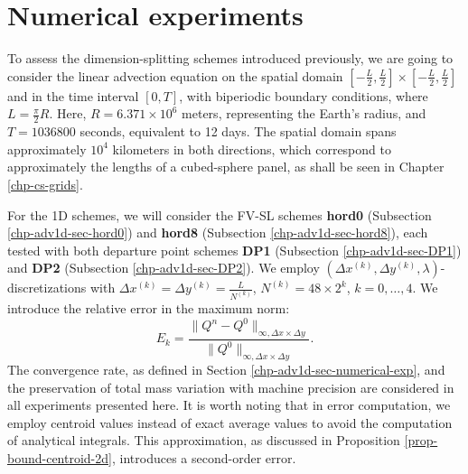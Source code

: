\section{Numerical experiments}
\label{sec-ds-exp}
To assess the dimension-splitting schemes introduced previously, we are going to consider the linear advection 
equation on the spatial domain $[-\frac{L}{2},\frac{L}{2}]\times[-\frac{L}{2},\frac{L}{2}]$ and in the time interval $[0,T]$, 
with biperiodic boundary conditions, where $L = \frac{\pi}{2} R$. Here, $R = 6.371 \times 10^6$ meters, 
representing the Earth's radius, and $T = 1036800$ seconds, equivalent to 12 days. 
The spatial domain spans approximately $10^4$ kilometers in both directions,
which correspond to approximately the lengths of a cubed-sphere panel,
as shall be seen in Chapter \ref{chp-cs-grids}.

For the 1D schemes, we will consider the FV-SL schemes \textbf{hord0} (Subsection \ref{chp-adv1d-sec-hord0}) and
\textbf{hord8} (Subsection \ref{chp-adv1d-sec-hord8}), 
each tested with both departure point schemes \textbf{DP1} (Subsection \ref{chp-adv1d-sec-DP1}) and \textbf{DP2} (Subsection \ref{chp-adv1d-sec-DP2}).
We employ $(\Delta x^{(k)},\Delta y^{(k)},\lambda)$-discretizations with $\Delta x^{(k)} = \Delta y^{(k)} = \frac{L}{N^{(k)}}$,
$N^{(k)} = 48 \times 2^k$, $k=0,\ldots, 4$.
We introduce the relative error in the maximum norm:
\begin{equation*}
	E_k = 
	\frac{\| Q^n - Q^0 \|_{\infty, \Delta x \times \Delta y}}
	{\|Q^0\|_{\infty, \Delta x \times \Delta y}}.
\end{equation*}
The convergence rate, as defined in Section \ref{chp-adv1d-sec-numerical-exp}, and the preservation of total mass variation with 
machine precision are considered in all experiments presented here.
It is worth noting that in error computation, we employ centroid values instead of exact average values to avoid 
the computation of analytical integrals.
This approximation, as discussed in Proposition \ref{prop-bound-centroid-2d}, introduces a second-order error.

